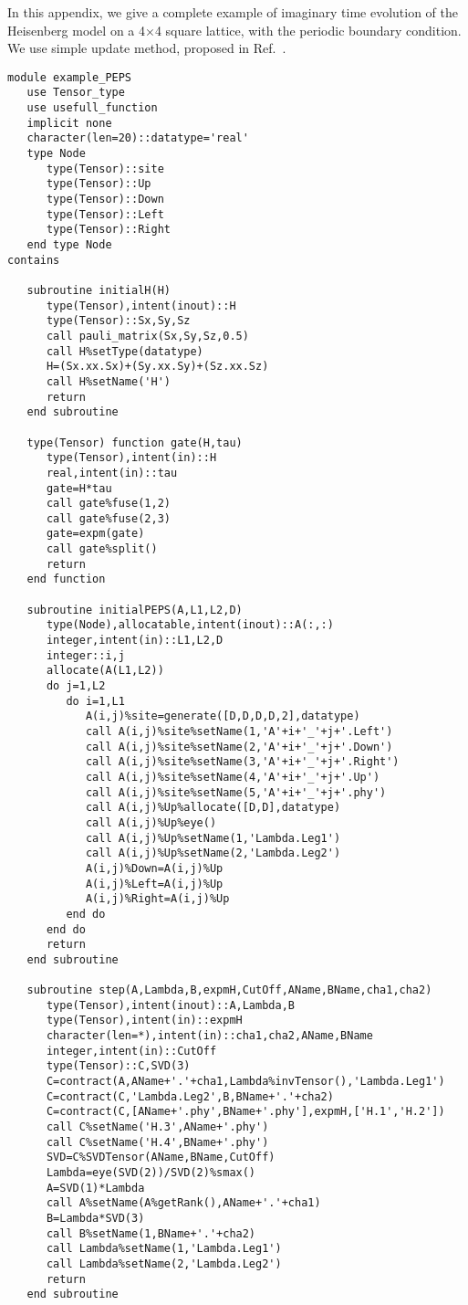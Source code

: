 \documentclass[preprint,3p,times,preprint,showpacs,amsmath,superscriptaddress,floatfix]{elsarticle}
\begin{document}
In this appendix, we give a complete example of imaginary time evolution of the Heisenberg model on a 4$\times$4 square lattice, with
the periodic boundary condition.
We use simple update method, proposed in Ref.~\cite{Xiang2008}.
\begin{verbatim}
module example_PEPS
   use Tensor_type
   use usefull_function
   implicit none
   character(len=20)::datatype='real'
   type Node
      type(Tensor)::site
      type(Tensor)::Up
      type(Tensor)::Down
      type(Tensor)::Left
      type(Tensor)::Right
   end type Node
contains

   subroutine initialH(H)
      type(Tensor),intent(inout)::H
      type(Tensor)::Sx,Sy,Sz
      call pauli_matrix(Sx,Sy,Sz,0.5)
      call H%setType(datatype)
      H=(Sx.xx.Sx)+(Sy.xx.Sy)+(Sz.xx.Sz)
      call H%setName('H')
      return
   end subroutine

   type(Tensor) function gate(H,tau)
      type(Tensor),intent(in)::H
      real,intent(in)::tau
      gate=H*tau
      call gate%fuse(1,2)
      call gate%fuse(2,3)
      gate=expm(gate)
      call gate%split()
      return
   end function

   subroutine initialPEPS(A,L1,L2,D)
      type(Node),allocatable,intent(inout)::A(:,:)
      integer,intent(in)::L1,L2,D
      integer::i,j
      allocate(A(L1,L2))
      do j=1,L2
         do i=1,L1
            A(i,j)%site=generate([D,D,D,D,2],datatype)
            call A(i,j)%site%setName(1,'A'+i+'_'+j+'.Left')
            call A(i,j)%site%setName(2,'A'+i+'_'+j+'.Down')
            call A(i,j)%site%setName(3,'A'+i+'_'+j+'.Right')
            call A(i,j)%site%setName(4,'A'+i+'_'+j+'.Up')
            call A(i,j)%site%setName(5,'A'+i+'_'+j+'.phy')
            call A(i,j)%Up%allocate([D,D],datatype)
            call A(i,j)%Up%eye()
            call A(i,j)%Up%setName(1,'Lambda.Leg1')
            call A(i,j)%Up%setName(2,'Lambda.Leg2')
            A(i,j)%Down=A(i,j)%Up
            A(i,j)%Left=A(i,j)%Up
            A(i,j)%Right=A(i,j)%Up
         end do
      end do
      return
   end subroutine

   subroutine step(A,Lambda,B,expmH,CutOff,AName,BName,cha1,cha2)
      type(Tensor),intent(inout)::A,Lambda,B
      type(Tensor),intent(in)::expmH
      character(len=*),intent(in)::cha1,cha2,AName,BName
      integer,intent(in)::CutOff
      type(Tensor)::C,SVD(3)
      C=contract(A,AName+'.'+cha1,Lambda%invTensor(),'Lambda.Leg1')
      C=contract(C,'Lambda.Leg2',B,BName+'.'+cha2)
      C=contract(C,[AName+'.phy',BName+'.phy'],expmH,['H.1','H.2'])
      call C%setName('H.3',AName+'.phy')
      call C%setName('H.4',BName+'.phy')
      SVD=C%SVDTensor(AName,BName,CutOff)
      Lambda=eye(SVD(2))/SVD(2)%smax()
      A=SVD(1)*Lambda
      call A%setName(A%getRank(),AName+'.'+cha1)
      B=Lambda*SVD(3)
      call B%setName(1,BName+'.'+cha2)
      call Lambda%setName(1,'Lambda.Leg1')
      call Lambda%setName(2,'Lambda.Leg2')
      return
   end subroutine


\end{verbatim}
\end{document}

